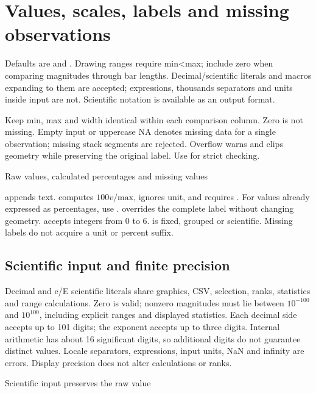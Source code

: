 \section{Values, scales, labels and missing observations}
Defaults are  and . Drawing ranges require min<max; include zero
when comparing magnitudes through bar lengths. Decimal/scientific literals and macros expanding to them are accepted;
expressions, thousands separators and units inside input are not.
Scientific notation is available as an output format.

Keep min, max and width identical within each comparison column.
Zero is not missing. Empty input or uppercase NA denotes missing data for a single
observation; missing stack segments are rejected. Overflow warns and clips geometry
while preserving the original label. Use  for strict checking.

\begin{demo}{Raw values, calculated percentages and missing values}




\end{demo}
 appends text.  computes $100v/\mathrm{max}$,
ignores unit, and requires . For values already expressed as percentages,
use .  overrides the complete label without changing geometry.
 accepts integers from 0 to 6.  is fixed, grouped
or scientific. Missing labels do not acquire a unit or percent suffix.

\clearpage

\subsection{Scientific input and finite precision}
Decimal and e/E scientific literals share graphics, CSV, selection, ranks,
statistics and range calculations. Zero is valid; nonzero magnitudes must lie
between $10^{-100}$ and $10^{100}$, including explicit ranges and displayed
statistics. Each decimal side accepts up to 101 digits; the exponent accepts
up to three digits. Internal arithmetic has about 16 significant digits, so
additional digits do not guarantee distinct values. Locale separators,
expressions, input units, NaN and infinity are errors. Display precision does
not alter calculations or ranks.
\begin{demo}{Scientific input preserves the raw value}
\end{demo}
